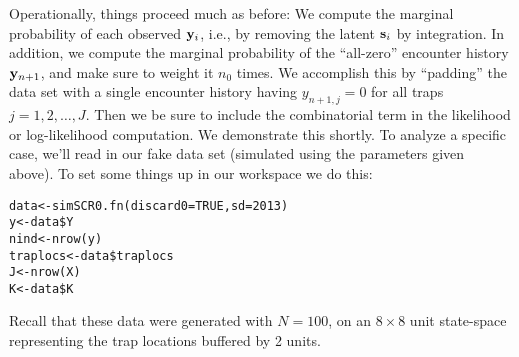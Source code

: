 Operationally, things proceed much as before: 
We compute the marginal probability of each observed ${\bf y}_{i}$,
i.e., by removing the latent ${\bf s}_{i}$ by integration. In
addition, we 
 compute the marginal probability of the ``all-zero'' encounter
history ${\bf y}_{n+1}$, and make sure to weight it $n_{0}$ times. We
accomplish this by ``padding'' the data set with a single encounter
history having $y_{n+1,j}=0$ for all traps $j=1,2,\ldots,J$. Then we
be sure to include the combinatorial term in the likelihood or
log-likelihood computation. We demonstrate this shortly.
To analyze a specific case, we'll read in our fake data set (simulated
using the parameters given above). To set some things up in our
workspace we do this:
\begin{verbatim}
data<-simSCR0.fn(discard0=TRUE,sd=2013)
y<-data$Y
nind<-nrow(y)
traplocs<-data$traplocs
J<-nrow(X)
K<-data$K
\end{verbatim}
Recall that these data were generated with $N=100$, on an $8 \times 8$ unit
state-space representing the trap locations  buffered by 2 units.

